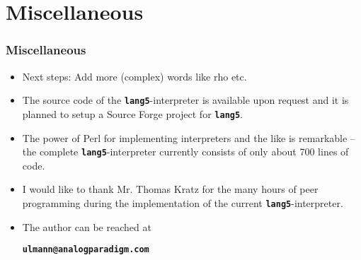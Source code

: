 \documentclass{beamer}
\newcommand*{\F}{{\tt\bf lang5}}
\begin{document}
 \section{Miscellaneous}
  \begin{frame}
   \frametitle{Miscellaneous}
   \begin{itemize}
    \item Next steps: Add more (complex) words like rho etc.
    \item The source code of the \F-interpreter is available upon request
     and it is planned to setup a Source Forge project for \F.
    \item The power of Perl for implementing interpreters and the like is
     remarkable -- the complete \F-interpreter currently consists of 
     only about 700 lines of code.
    \item I would like to thank Mr. Thomas Kratz for the many hours of peer 
     programming during the implementation of the current \F-interpreter.
    \item The author can be reached at
     \begin{center}
      {\tt\bf ulmann@analogparadigm.com}
     \end{center}
   \end{itemize}
  \end{frame}
\end{document}
